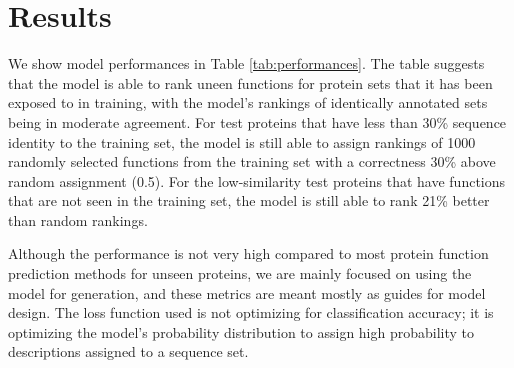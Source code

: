 \documentclass{article}
\begin{document}
\section{Results} %

        We show model performances in Table \ref{tab:performances}. The table suggests that the model is able to rank uneen functions for protein sets that it has been exposed to in training, with the model's rankings of identically annotated sets being in moderate agreement. For test proteins that have less than 30\% sequence identity to the training set, the model is still able to assign rankings of 1000 randomly selected functions from the training set with a correctness 30\% above random assignment (0.5). For the low-similarity test proteins that have functions that are not seen in the training set, the model is still able to rank 21\% better than random rankings.

        Although the performance is not very high compared to most protein function prediction methods for unseen proteins, we are mainly focused on using the model for generation, and these metrics are meant mostly as guides for model design. The loss function used is not optimizing for classification accuracy; it is optimizing the model's probability distribution to assign high probability to descriptions assigned to a sequence set.
\end{document}
